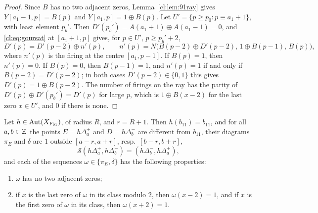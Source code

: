 \begin{proof}
Since $B$ has no two adjacent zeros, Lemma~\ref{cl:lem:91ray} gives $Y[a_1-1,p]=B(p)$ and $Y[a_1,p]=1\oplus B(p)$. Let $U'=\{p\ge p_0:p\equiv a_1+1\}$, with least element $p_b'$. Then $D'(p_b')=A(a_1+1)\oplus A(a_1-1)=0$, and \eqref{cl:eq:goursat} at $[a_1+1,p]$ gives, for $p\in U'$, $p\ge p_b'+2$,
\[
D'(p)=D'(p-2)\oplus n'(p),\qquad n'(p)=N\bigl(B(p-2)\oplus D'(p-2),\,1\oplus B(p-1),\,B(p)\bigr),
\]
where $n'(p)$ is the firing at the centre $[a_1,p-1]$. If $B(p)=1$, then $n'(p)=0$. If $B(p)=0$, then $B(p-1)=1$, and $n'(p)=1$ if and only if $B(p-2)=D'(p-2)$; in both cases $D'(p-2)\in\{0,1\}$ this gives $D'(p)=1\oplus B(p-2)$. The number of firings on the ray has the parity of $D'(p)\oplus D'(p_b')=D'(p)$ for large $p$, which is $1\oplus B(x-2)$ for the last zero $x\in U'$, and $0$ if there is none.
\end{proof}

\begin{proposition}\label{cl:prop:91KR}
Let $h\in\operatorname{Aut}(X_{F_{91}})$, of radius $R$, and $r=R+1$. Then $h(b_{11})=b_{11}$, and for all $a,b\in\mathbb{Z}$ the points $E=h\Delta^+_a$ and $D=h\Delta^-_b$ are different from $b_{11}$, their diagrams $\pi_E$ and $\delta$ are $1$ outside $[a-r,a+r]$, resp.\ $[b-r,b+r]$,
\[
\mathcal S(h\Delta^+_a,h\Delta^-_b)=(h\Delta^-_b,h\Delta^+_a),
\]
and each of the sequences $\omega\in\{\pi_E,\delta\}$ has the following properties:
\begin{enumerate}
\item[(i)] $\omega$ has no two adjacent zeros;
\item[(ii)] if $x$ is the last zero of $\omega$ in its class modulo $2$, then $\omega(x-2)=1$, and if $x$ is the first zero of $\omega$ in its class, then $\omega(x+2)=1$.
\end{enumerate}
\end{proposition}

